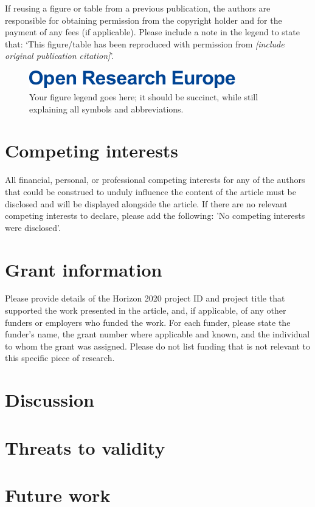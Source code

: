 \documentclass[10pt,a4paper]{article}
\begin{document}
If reusing a figure or table from a previous publication, the authors are responsible for obtaining permission from the copyright holder and for the payment of any fees (if applicable). Please include a note in the legend to state that: ‘This figure/table has been reproduced with permission from \textit{[include original publication citation]}’.

\begin{figure}
	\centering
	\includegraphics[width=0.8\textwidth]{ORE Header.png}
	\caption{\label{fig:your-figure}Your figure legend goes here; it should be succinct, while still explaining all symbols and abbreviations. }
\end{figure}

\section*{Competing interests}
All financial, personal, or professional competing interests for any of the authors that could be construed to unduly influence the content of the article must be disclosed and will be displayed alongside the article. If there are no relevant competing interests to declare, please add the following: 'No competing interests were disclosed'.

\section*{Grant information}
Please provide details of the Horizon 2020 project ID and project title that supported the work presented in the article, and, if applicable, of any other funders or employers who funded the work. For each funder, please state the funder’s name, the grant number where applicable and known, and the individual to whom the grant was assigned.
Please do not list funding that is not relevant to this specific piece of research.

\section*{Discussion}

\section*{Threats to validity}

\section*{Future work}
\end{document}

